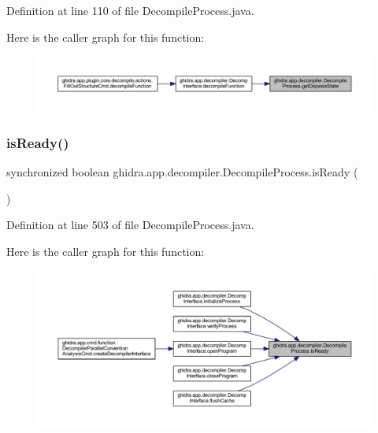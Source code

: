 Definition at line 110 of file Decompile\+Process.\+java.

Here is the caller graph for this function\+:
\nopagebreak
\begin{figure}[H]
\begin{center}
\leavevmode
\includegraphics[width=350pt]{classghidra_1_1app_1_1decompiler_1_1_decompile_process_ac9ea5dc37b98e60a02ebc537bde184bb_icgraph}
\end{center}
\end{figure}
\mbox{\label{classghidra_1_1app_1_1decompiler_1_1_decompile_process_a7ceab405dca0a6c7e79998fd632c2c0b}} 
\subsubsection{\texorpdfstring{isReady()}{isReady()}}
{\footnotesize\ttfamily synchronized boolean ghidra.\+app.\+decompiler.\+Decompile\+Process.\+is\+Ready (\begin{DoxyParamCaption}{ }\end{DoxyParamCaption})\hspace{0.3cm}{\ttfamily [inline]}}



Definition at line 503 of file Decompile\+Process.\+java.

Here is the caller graph for this function\+:
\nopagebreak
\begin{figure}[H]
\begin{center}
\leavevmode
\includegraphics[width=350pt]{classghidra_1_1app_1_1decompiler_1_1_decompile_process_a7ceab405dca0a6c7e79998fd632c2c0b_icgraph}
\end{center}
\end{figure}
\mbox{\label{classghidra_1_1app_1_1decompiler_1_1_decompile_process_a40583f5d5b24e837f7837ccab1510330}} 
